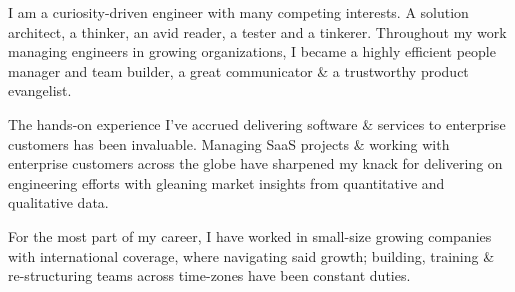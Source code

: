 I am a curiosity-driven engineer with many competing interests. A solution architect, a thinker, an avid reader, a tester and a tinkerer. Throughout my work managing engineers in growing organizations, I became a highly efficient people manager and team builder, a great communicator \& a trustworthy product evangelist.

The hands-on experience I've accrued delivering software \& services to enterprise customers has been invaluable. Managing SaaS projects \& working with enterprise customers across the globe have sharpened my knack for delivering on engineering efforts with gleaning market insights from quantitative and qualitative data.

For the most part of my career, I have worked in small-size growing companies with international coverage, where navigating said growth; building, training \& re-structuring teams across time-zones have been constant duties.